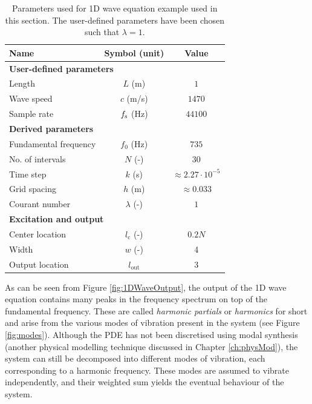 \begin{table}[h]
    \begin{center}
    \begin{tabular}{|l|c|c|}
        \hline
        Name & Symbol (unit) & Value\\ \hline
        \multicolumn{3}{|l|}{\bf User-defined parameters}\\ \hline
        Length & $L$ (m) & $1$\\
        Wave speed & $c$ (m/s) & $1470$\\
        Sample rate & $f_\text{s}$ (Hz) & $44100$ \\\hline
        \multicolumn{3}{|l|}{\bf Derived parameters}\\ \hline
        Fundamental frequency & $f_0$ (Hz) & $735$\\
        No. of intervals & $N$ (-) & $30$ \\
        Time step & $k$ (s)& $\approx 2.27\cdot 10^{-5}$ \\
        Grid spacing & $h$ (m)& $\approx 0.033$ \\
        Courant number & $\lambda$ (-)& $1$ \\\hline
        \multicolumn{3}{|l|}{\bf Excitation and output}\\ \hline
        Center location& $l_\text{c}$ (-)& $0.2N$\\
        Width& $w$ (-)& 4\\
        Output location & $l_\text{out}$ & 3 \\\hline
    \end{tabular}
    \caption{Parameters used for 1D wave equation example used in this section. The user-defined parameters have been chosen such that $\lambda = 1$. \label{tab:1DWaveParams}}
    \end{center}
\end{table}

As can be seen from Figure \ref{fig:1DWaveOutput}, the output of the 1D wave equation contains many peaks in the frequency spectrum on top of the fundamental frequency. These are called \textit{harmonic partials} or \textit{harmonics} for short and arise from the various modes of vibration present in the system (see Figure \ref{fig:modes}). Although the PDE has not been discretised using modal synthesis (another physical modelling technique discussed in Chapter \ref{ch:physMod}), the system can still be decomposed into different modes of vibration, each corresponding to a harmonic frequency. These modes are assumed to vibrate independently, and their weighted sum yields the eventual behaviour of the system. 

